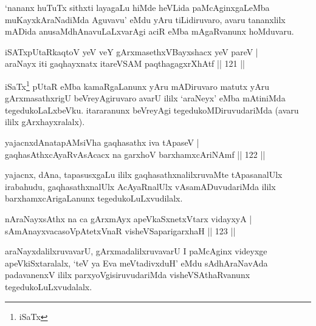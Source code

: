 \begin{artha}
`nananx huTuTx sithxti layagaLu hiMde heVLida paMcAginxgaLeMba
muKayxkAraNadiMda Aguvavu' eMdu yAru tiLidiruvaro, avaru tananxlilx
mADida anusaMdhAnavuLaLxvarAgi aciR eMba mAgaRvanunx hoMduvaru.
\end{artha}


\begin{shl}
iSATxpUtaRkaqtoV yeV veY gArxmasethxVBayxshacx yeV pareV | \\
araNayx iti gaqhayxnatx itareVSAM paqthagagxrXhAtf \hfill|| 121 || 
\end{shl}

\begin{artha}
iSaTx\footnote{iSaTx} pUtaR eMba kamaRgaLanunx yAru mADiruvaro
matutx yAru gArxmasathxrigU beVreyAgiruvaro avarU ililx `araNeyx' eMba
mAtiniMda tegedukoLaLxbeVku. itararanunx beVreyAgi
tegedukoMDiruvudariMda (avaru ililx gArxhayxralalx).
\end{artha}


\begin{shl}
yajacnxdAnatapAMsiVha gaqhasathx iva tApaseV | \\
gaqhasAthxcAyaRvAsAcacx na garxhoV barxhamxcAriNAmf \hfill|| 122 || 
\end{shl}

\begin{artha}
yajacnx, dAna, tapasusxgaLu ililx gaqhasathxnalilxruvaMte tApasanalUlx
irabahudu, gaqhasathxnalUlx AcAyaRnalUlx vAsamADuvudariMda ililx
barxhamxcArigaLanunx tegedukoLuLxvudilalx.
\end{artha}

\begin{shl}
nAraNayxsAthx na ca gArxmAyx apeVkaSxnetxV\s tarx vidayxyA | \\
sAmAnayxvacasoVpAtetxVnaR visheVSaparigarxhaH \hfill|| 123 || 
\end{shl}

\begin{artha}
araNayxdalilxruvavarU, gArxmadalilxruvavarU I paMcAginx videyxge
apeVkiSxtaralalx, `teV ya Eva meVtadivxduH' eMdu sAdhAraNavAda
padavanenxV ililx parxyoVgisiruvudariMda visheVSAthaRvanunx
tegedukoLuLxvudalalx.
\end{artha}


